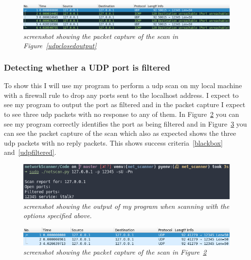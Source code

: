 \documentclass[titlepage]{article}
\let\Oldsubsubsection\subsubsection{}
\renewcommand{\subsubsection}{\FloatBarrier\Oldsubsubsection}
\begin{document}
\begin{figure}[H]
  \centering
  \includegraphics[width=\textwidth]{udpclosedpcap.png}
  \caption{\textit{%
    screenshot showing the packet capture of the scan in Figure~\ref{udpclosedoutput}
}}\label{udpclosedcap}
\end{figure}

\subsubsection{Detecting whether a UDP port is filtered}
To show this I will use my program to perform a \gls{udp} scan on my local machine
with a firewall rule to drop any ports sent to the localhost address. I expect to see
my program to output the port as filtered and in the packet capture I expect to see
three \gls{udp} packets with no response to any of them.
In Figure~\ref{udpfilteredoutput} you can see my program correctly identifies
the port as being filtered and in Figure~\ref{udpfilteredpcap} you can see
the packet capture of the scan which also as expected shows the three \gls{udp}
packets with no reply packets. This shows success criteria~\ref{blackbox}
and~\ref{udpfiltered}.

\begin{figure}[H]
  \centering
  \includegraphics[width=\textwidth]{udpfilteredoutput.png}
  \caption{\textit{%
    screenshot showing the output of my program when scanning with the
    options specified above.
}}\label{udpfilteredoutput}
\end{figure}

\begin{figure}[H]
  \centering
  \includegraphics[width=\textwidth]{udpfilteredpcap.png}
  \caption{\textit{%
    screenshot showing the packet capture of the scan in Figure~\ref{udpfilteredoutput}
}}\label{udpfilteredpcap}
\end{figure}
\end{document}
